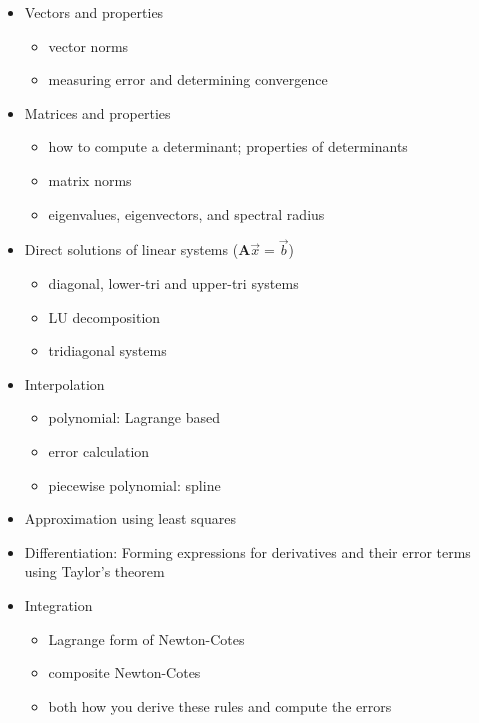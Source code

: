 \documentclass[12pt]{article}
\newcommand{\ve}[1]{\ensuremath{\mathbf{#1}}}
\begin{document}
\begin{itemize}
\item Vectors and properties
  \begin{itemize}
  \item vector norms
  \item measuring error and determining convergence
  \end{itemize}

\item Matrices and properties
  \begin{itemize}
  \item how to compute a determinant; properties of determinants
  \item matrix norms
  \item eigenvalues, eigenvectors, and spectral radius
  \end{itemize}

\item Direct solutions of linear systems ($\ve{A}\vec{x} = \vec{b}$)
  \begin{itemize}
  \item diagonal, lower-tri and upper-tri systems
  \item LU decomposition
  \item tridiagonal systems
  \end{itemize}

\item Interpolation
  \begin{itemize}
  \item polynomial: Lagrange based
  \item error calculation
  \item piecewise polynomial: spline
  \end{itemize}

\item Approximation using least squares

\item Differentiation: Forming expressions for derivatives and their error terms using Taylor's theorem

\item Integration
  \begin{itemize}
  \item Lagrange form of Newton-Cotes
  \item composite Newton-Cotes
  \item both how you derive these rules and compute the errors
  \end{itemize}


\end{itemize}
\end{document}
